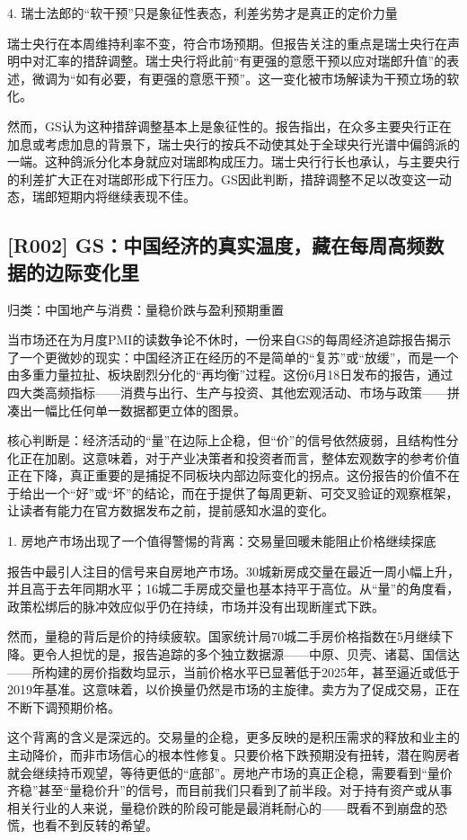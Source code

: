 \documentclass[11pt]{ctexart}
\begin{document}
4. 瑞士法郎的“软干预”只是象征性表态，利差劣势才是真正的定价力量

瑞士央行在本周维持利率不变，符合市场预期。但报告关注的重点是瑞士央行在声明中对汇率的措辞调整。瑞士央行将此前“有更强的意愿干预以应对瑞郎升值”的表述，微调为“如有必要，有更强的意愿干预”。这一变化被市场解读为干预立场的软化。

然而，GS认为这种措辞调整基本上是象征性的。报告指出，在众多主要央行正在加息或考虑加息的背景下，瑞士央行的按兵不动使其处于全球央行光谱中偏鸽派的一端。这种鸽派分化本身就应对瑞郎构成压力。瑞士央行行长也承认，与主要央行的利差扩大正在对瑞郎形成下行压力。GS因此判断，措辞调整不足以改变这一动态，瑞郎短期内将继续表现不佳。

\subsection{[R002] GS：中国经济的真实温度，藏在每周高频数据的边际变化里}
{\small\color{refgray}归类：中国地产与消费：量稳价跌与盈利预期重置}

当市场还在为月度PMI的读数争论不休时，一份来自GS的每周经济追踪报告揭示了一个更微妙的现实：中国经济正在经历的不是简单的“复苏”或“放缓”，而是一个由多重力量拉扯、板块剧烈分化的“再均衡”过程。这份6月18日发布的报告，通过四大类高频指标——消费与出行、生产与投资、其他宏观活动、市场与政策——拼凑出一幅比任何单一数据都更立体的图景。

核心判断是：经济活动的“量”在边际上企稳，但“价”的信号依然疲弱，且结构性分化正在加剧。这意味着，对于产业决策者和投资者而言，整体宏观数字的参考价值正在下降，真正重要的是捕捉不同板块内部边际变化的拐点。这份报告的价值不在于给出一个“好”或“坏”的结论，而在于提供了每周更新、可交叉验证的观察框架，让读者有能力在官方数据发布之前，提前感知水温的变化。

1. 房地产市场出现了一个值得警惕的背离：交易量回暖未能阻止价格继续探底

报告中最引人注目的信号来自房地产市场。30城新房成交量在最近一周小幅上升，并且高于去年同期水平；16城二手房成交量也基本持平于高位。从“量”的角度看，政策松绑后的脉冲效应似乎仍在持续，市场并没有出现断崖式下跌。

然而，量稳的背后是价的持续疲软。国家统计局70城二手房价格指数在5月继续下降。更令人担忧的是，报告追踪的多个独立数据源——中原、贝壳、诸葛、国信达——所构建的房价指数均显示，当前价格水平已显著低于2025年，甚至逼近或低于2019年基准。这意味着，以价换量仍然是市场的主旋律。卖方为了促成交易，正在不断下调预期价格。

这个背离的含义是深远的。交易量的企稳，更多反映的是积压需求的释放和业主的主动降价，而非市场信心的根本性修复。只要价格下跌预期没有扭转，潜在购房者就会继续持币观望，等待更低的“底部”。房地产市场的真正企稳，需要看到“量价齐稳”甚至“量稳价升”的信号，而目前我们只看到了前半段。对于持有资产或从事相关行业的人来说，量稳价跌的阶段可能是最消耗耐心的——既看不到崩盘的恐慌，也看不到反转的希望。
\end{document}
